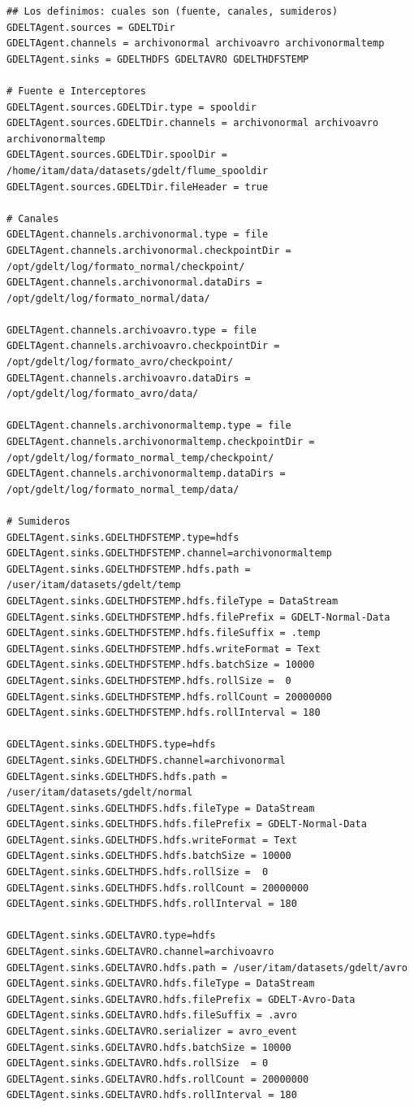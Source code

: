 \documentclass[]{article}
\begin{document}
\begin{verbatim}
## Los definimos: cuales son (fuente, canales, sumideros)
GDELTAgent.sources = GDELTDir
GDELTAgent.channels = archivonormal archivoavro archivonormaltemp
GDELTAgent.sinks = GDELTHDFS GDELTAVRO GDELTHDFSTEMP

# Fuente e Interceptores
GDELTAgent.sources.GDELTDir.type = spooldir
GDELTAgent.sources.GDELTDir.channels = archivonormal archivoavro archivonormaltemp
GDELTAgent.sources.GDELTDir.spoolDir = /home/itam/data/datasets/gdelt/flume_spooldir
GDELTAgent.sources.GDELTDir.fileHeader = true

# Canales
GDELTAgent.channels.archivonormal.type = file
GDELTAgent.channels.archivonormal.checkpointDir = /opt/gdelt/log/formato_normal/checkpoint/
GDELTAgent.channels.archivonormal.dataDirs = /opt/gdelt/log/formato_normal/data/

GDELTAgent.channels.archivoavro.type = file
GDELTAgent.channels.archivoavro.checkpointDir = /opt/gdelt/log/formato_avro/checkpoint/
GDELTAgent.channels.archivoavro.dataDirs = /opt/gdelt/log/formato_avro/data/

GDELTAgent.channels.archivonormaltemp.type = file
GDELTAgent.channels.archivonormaltemp.checkpointDir = /opt/gdelt/log/formato_normal_temp/checkpoint/
GDELTAgent.channels.archivonormaltemp.dataDirs = /opt/gdelt/log/formato_normal_temp/data/

# Sumideros
GDELTAgent.sinks.GDELTHDFSTEMP.type=hdfs
GDELTAgent.sinks.GDELTHDFSTEMP.channel=archivonormaltemp
GDELTAgent.sinks.GDELTHDFSTEMP.hdfs.path = /user/itam/datasets/gdelt/temp
GDELTAgent.sinks.GDELTHDFSTEMP.hdfs.fileType = DataStream
GDELTAgent.sinks.GDELTHDFSTEMP.hdfs.filePrefix = GDELT-Normal-Data
GDELTAgent.sinks.GDELTHDFSTEMP.hdfs.fileSuffix = .temp
GDELTAgent.sinks.GDELTHDFSTEMP.hdfs.writeFormat = Text
GDELTAgent.sinks.GDELTHDFSTEMP.hdfs.batchSize = 10000
GDELTAgent.sinks.GDELTHDFSTEMP.hdfs.rollSize =  0       
GDELTAgent.sinks.GDELTHDFSTEMP.hdfs.rollCount = 20000000
GDELTAgent.sinks.GDELTHDFSTEMP.hdfs.rollInterval = 180 

GDELTAgent.sinks.GDELTHDFS.type=hdfs
GDELTAgent.sinks.GDELTHDFS.channel=archivonormal
GDELTAgent.sinks.GDELTHDFS.hdfs.path = /user/itam/datasets/gdelt/normal
GDELTAgent.sinks.GDELTHDFS.hdfs.fileType = DataStream
GDELTAgent.sinks.GDELTHDFS.hdfs.filePrefix = GDELT-Normal-Data
GDELTAgent.sinks.GDELTHDFS.hdfs.writeFormat = Text
GDELTAgent.sinks.GDELTHDFS.hdfs.batchSize = 10000
GDELTAgent.sinks.GDELTHDFS.hdfs.rollSize =  0       
GDELTAgent.sinks.GDELTHDFS.hdfs.rollCount = 20000000
GDELTAgent.sinks.GDELTHDFS.hdfs.rollInterval = 180 

GDELTAgent.sinks.GDELTAVRO.type=hdfs
GDELTAgent.sinks.GDELTAVRO.channel=archivoavro
GDELTAgent.sinks.GDELTAVRO.hdfs.path = /user/itam/datasets/gdelt/avro
GDELTAgent.sinks.GDELTAVRO.hdfs.fileType = DataStream
GDELTAgent.sinks.GDELTAVRO.hdfs.filePrefix = GDELT-Avro-Data
GDELTAgent.sinks.GDELTAVRO.hdfs.fileSuffix = .avro
GDELTAgent.sinks.GDELTAVRO.serializer = avro_event
GDELTAgent.sinks.GDELTAVRO.hdfs.batchSize = 10000
GDELTAgent.sinks.GDELTAVRO.hdfs.rollSize  = 0
GDELTAgent.sinks.GDELTAVRO.hdfs.rollCount = 20000000
GDELTAgent.sinks.GDELTAVRO.hdfs.rollInterval = 180 
\end{verbatim}
\end{document}
